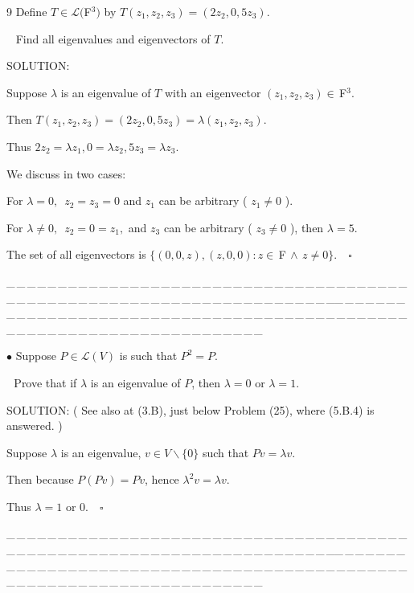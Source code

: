 \documentclass[a4paper, 11pt, UTF8]{article}
\def\Lm{\mathcal{L}}
\def\Fbfc{$\,{\timesbf F}$}
\begin{document}
\begin{large}
{\timesbf\Large 9} 
{\timessl\Large Define $T\in\Lm(${\timesbf F}$^3)$ by $T(z_1,z_2,z_3)=(2z_2, 0,5z_3)$.}\par\,\,\,
{\timessl\Large Find all eigenvalues and eigenvectors of $T$.
}\par
{\timesbf S\footnotesize{OLUTION:}}\par\quad
Suppose $\lambda$ is an eigenvalue of $T$ with an eigenvector $(z_1,z_2,z_3)\in\Fbfc^3.$\par\quad
Then $T(z_1,z_2,z_3)=(2z_2, 0,5z_3)=\lambda(z_1,z_2,z_3).$\par\quad
Thus $2z_2=\lambda z_1,$\quad$0=\lambda z_2,$\quad$5z_3=\lambda z_3.$\par\quad
We discuss in two cases:\par\quad
For $\lambda=0,$\, $z_2=z_3=0$ and $z_1$ can be arbitrary ( $z_1\neq 0$ ).\par\quad
For $\lambda\neq 0,$\, $z_2=0=z_1,$ and $z_3$ can be arbitrary ( $z_3\neq 0$ ), then $\lambda=5$.\par\quad
The set of all eigenvectors is $\{(0,0,z),(z,0,0):z\in\Fbfc\,\wedge\,z\neq 0\}.\quad\square$\par
{\tiny \_\,\_\,\_\,\_\,\_\,\_\,\_\,\_\,\_\,\_\,\_\,\_\,\_\,\_\,\_\,\_\,\_\,\_\,\_\,\_\,\_\,\_\,\_\,\_\,\_\,\_\,\_\,\_\,\_\,\_\,\_\,\_\,\_\,\_\,\_\,\_\,\_\,\_\,\_\,\_\,\_\,\_\,\_\,\_\,\_\,\_\,\_\,\_\,\_\,\_\,\_\,\_\,\_\,\_\,\_\,\_\,\_\,\_\,\_\,\_\,\_\,\_\,\_\,\_\,\_\,\_\,\_\,\_\,\_\,\_\,\_\_\,\_\,\_\,\_\,\_\,\_\,\_\,\_\,\_\,\_\,\_\,\_\,\_\,\_\,\_\,\_\,\_\,\_\,\_\,\_\,\_\,\_\,\_\,\_\,\_\,\_\,\_\,\_\,\_\,\_\,\_\,\_\,\_\,\_\,\_\,\_\,\_\,\_\,\_\,\_\,\_\,\_\,\_\,\_\,\_\,\_\,\_\,\_\,\_\,\_\,\_\,\_\,\_\,\_\,\_\,\_\,\_\,\_\,\_\,\_\,\_\,\_\,\_\,\_\,\_\,\_\,\_\,\_\,\_\,\_\,\_}\par

{\small $\bullet$} {\timessl\Large 
Suppose $P\in\Lm(V)$ is such that $P^2 = P$.}\par\,\,
{\timessl\Large Prove that if $\lambda$ is an eigenvalue of $P$, then $\lambda = 0$ or $\lambda = 1$.
}\par
{\timesbf S\footnotesize{OLUTION:}} ( See also at (3.B), just below Problem (25), where (5.B.4) is answered. )\par\quad
Suppose $\lambda$ is an eigenvalue, $v\in V\backslash\{0\}$ such that $Pv=\lambda v.$\par\quad
Then because $P(Pv)=Pv$, hence $\lambda^2 v=\lambda v.$\par\quad
Thus $\lambda=1$ or $0.\quad\square$\par
{\tiny \_\,\_\,\_\,\_\,\_\,\_\,\_\,\_\,\_\,\_\,\_\,\_\,\_\,\_\,\_\,\_\,\_\,\_\,\_\,\_\,\_\,\_\,\_\,\_\,\_\,\_\,\_\,\_\,\_\,\_\,\_\,\_\,\_\,\_\,\_\,\_\,\_\,\_\,\_\,\_\,\_\,\_\,\_\,\_\,\_\,\_\,\_\,\_\,\_\,\_\,\_\,\_\,\_\,\_\,\_\,\_\,\_\,\_\,\_\,\_\,\_\,\_\,\_\,\_\,\_\,\_\,\_\,\_\,\_\,\_\,\_\_\,\_\,\_\,\_\,\_\,\_\,\_\,\_\,\_\,\_\,\_\,\_\,\_\,\_\,\_\,\_\,\_\,\_\,\_\,\_\,\_\,\_\,\_\,\_\,\_\,\_\,\_\,\_\,\_\,\_\,\_\,\_\,\_\,\_\,\_\,\_\,\_\,\_\,\_\,\_\,\_\,\_\,\_\,\_\,\_\,\_\,\_\,\_\,\_\,\_\,\_\,\_\,\_\,\_\,\_\,\_\,\_\,\_\,\_\,\_\,\_\,\_\,\_\,\_\,\_\,\_\,\_\,\_\,\_\,\_\,\_}\par



\end{large}
\end{document}
